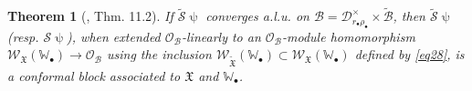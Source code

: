 \documentclass[12pt,a4paper,notitlepage]{article}
\theoremstyle{definition}
\newtheorem{rem}[df]{Remark}
\theoremstyle{plain}
\newtheorem{thm}[df]{Theorem}
\newcommand{\fk}{\mathfrak}
\newcommand{\mc}{\mathcal}
\newcommand{\wtd}{\widetilde}
\newcommand{\scr}{\mathscr}
\newcommand{\blt}{\bullet}
\newcommand{\Wbb}{\mathbb W}
\newcommand{\Mbb}{\mathbb M}
\numberwithin{equation}{section}
\begin{document}

\begin{thm}[\cite{Gui20}, Thm. 11.2]\label{lb8}
If $\wtd{\mc S}\uppsi$ converges a.l.u. on  $\mc B=\mc D_{r_\blt\rho_\blt}^\times\times\wtd{\mc B}$, then $\wtd{\mc S}\uppsi$ (resp. $\mc S\uppsi$), when extended $\scr O_{\mc B}$-linearly to an $\scr O_{\mc B}$-module homomorphism $\scr W_{\fk X}(\Wbb_\blt)\rightarrow\scr O_{\mc B}$ using the inclusion $\scr W_{\wtd{\fk X}}(\Wbb_\blt)\subset \scr W_{\fk X}(\Wbb_\blt)$ defined by \eqref{eq28},  is a conformal block associated to $\fk X$ and $\Wbb_\blt$. 
\end{thm}
\end{document}
